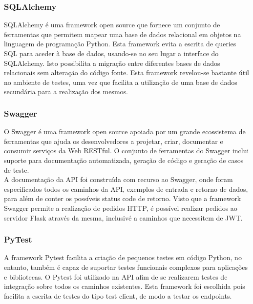 \subsubsection{SQLAlchemy}
SQLAlchemy é uma framework open source que fornece um conjunto de ferramentas que permitem mapear uma base de dados relacional em objetos na linguagem de programação Python.\cite{sqlalc}\newline
Esta framework evita a escrita de queries SQL para aceder à base de dados, usando-se no seu lugar a interface do SQLAlchemy. Isto possibilita a migração entre diferentes bases de dados relacionais sem alteração do código fonte.\newline
Esta framework revelou-se bastante útil no ambiente de testes, uma vez que facilita a utilização de uma base de dados secundária para a realização dos mesmos.

\subsubsection{Swagger}
O Swagger é uma framework open source apoiada por um grande ecossistema de ferramentas que ajuda os desenvolvedores a projetar, criar, documentar e consumir serviços da Web RESTful. O conjunto de ferramentas do Swagger inclui suporte para documentação automatizada, geração de código e geração de casos de teste.\cite{swagger}\newline\\
A documentação da API foi construída com recurso ao Swagger, onde foram especificados todos os caminhos da API, exemplos de entrada e retorno de dados, para além de conter os possíveis status code de retorno. \newline
Visto que a framework Swagger permite a realização de pedidos HTTP, é possível realizar pedidos ao servidor Flask através da mesma, inclusivé a caminhos que necessitem de JWT.

\subsubsection{PyTest}
A framework Pytest facilita a criação de pequenos testes em código Python, no entanto, também é capaz de suportar  testes funcionais complexos para aplicações e bibliotecas.\cite{pytest}\newline
O Pytest foi utilizado na API afim de se realizarem testes de integração sobre todos os caminhos existentes.  Esta framework foi escolhida pois facilita a escrita de testes do tipo test client, de modo a testar os endpoints. 

